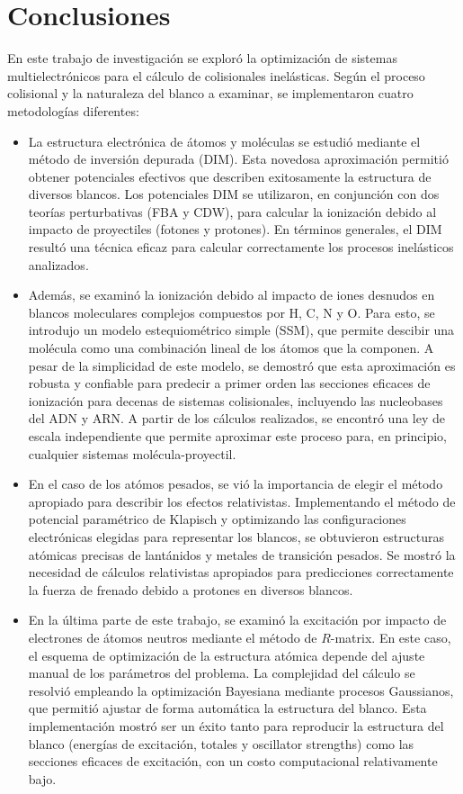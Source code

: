 \chapter{Conclusiones}
\label{chap:conclusiones}

En este trabajo de investigación se exploró la optimización de sistemas 
multielectrónicos para el cálculo de colisionales inelásticas. Según 
el proceso colisional y la naturaleza del blanco a examinar, se 
implementaron cuatro metodologías diferentes:
\begin{itemize}
\item 
La estructura electrónica de átomos y moléculas se estudió mediante el 
método de inversión depurada (DIM). Esta novedosa aproximación permitió 
obtener potenciales efectivos que describen exitosamente la estructura 
de diversos blancos. Los potenciales DIM se utilizaron, en conjunción 
con dos teorías perturbativas (FBA y CDW), para calcular la ionización 
debido al impacto de proyectiles (fotones y protones). En términos 
generales, el DIM resultó una técnica eficaz para calcular correctamente 
los procesos inelásticos analizados.

\item
Además, se examinó la ionización debido al impacto de iones desnudos en 
blancos moleculares complejos compuestos por H, C, N y O. Para esto, se 
introdujo un modelo estequiométrico simple (SSM), que permite descibir 
una molécula como una combinación lineal de los átomos que la componen. 
A pesar de la simplicidad de este modelo, se demostró que esta 
aproximación es robusta y confiable para predecir a primer orden las 
secciones eficaces de ionización para decenas de sistemas colisionales, 
incluyendo las nucleobases del ADN y ARN. A partir de los cálculos 
realizados, se encontró una ley de escala independiente que permite 
aproximar este proceso para, en principio, cualquier sistemas 
molécula-proyectil.

\item
En el caso de los atómos pesados, se vió la importancia de elegir el 
método apropiado para describir los efectos relativistas. Implementando 
el método de potencial paramétrico de Klapisch y optimizando las 
configuraciones electrónicas elegidas para representar los blancos, se 
obtuvieron estructuras atómicas precisas de lantánidos y metales de 
transición pesados. Se mostró la necesidad de cálculos relativistas
apropiados para predicciones correctamente la fuerza de frenado debido a 
protones en diversos blancos.

\item
En la última parte de este trabajo, se examinó la excitación por impacto 
de electrones de átomos neutros mediante el método de $R$-matrix. 
En este caso, el esquema de optimización de la estructura atómica 
depende del ajuste manual de los parámetros del problema. 
La complejidad del cálculo se resolvió empleando la optimización 
Bayesiana mediante procesos Gaussianos, que permitió ajustar de forma 
automática la estructura del blanco. Esta implementación mostró 
ser un éxito tanto para reproducir la estructura del blanco (energías 
de excitación, totales y oscillator strengths) como las secciones 
eficaces de excitación, con un costo computacional relativamente bajo.
\end{itemize}

